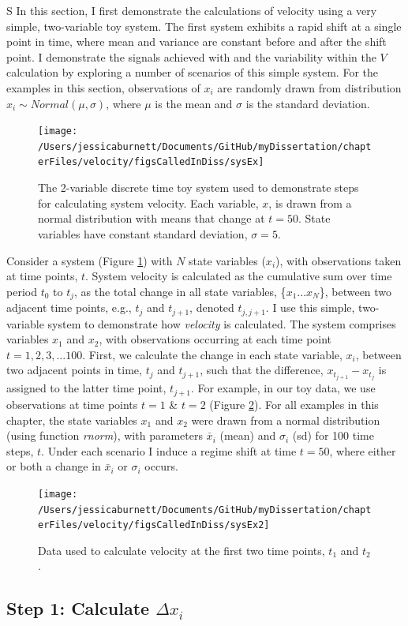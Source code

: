 \documentclass[12pt,twoside,openany]{reedthesis}
\begin{document}
S
In this section, I first demonstrate the calculations of velocity using a very simple, two-variable toy system. The first system exhibits a rapid shift at a single point in time, where mean and variance are constant before and after the shift point. I demonstrate the signals achieved with and the variability within the \(V\) calculation by exploring a number of scenarios of this simple system. For the examples in this section, observations of \(x_i\) are randomly drawn from distribution \(x_i\sim Normal(\mu, \sigma)\), where \(\mu\) is the mean and \(\sigma\) is the standard deviation.
\begin{figure}
\texttt{[image: /Users/jessicaburnett/Documents/GitHub/myDissertation/chapterFiles/velocity/figsCalledInDiss/sysEx]} \caption{The 2-variable discrete time toy system used to demonstrate steps for calculating system velocity. Each variable, $x$, is drawn from a normal distribution with means that change at $t = 50$. State variables have constant standard deviation, $\sigma = 5$.}\label{fig:sysEx}
\end{figure}
Consider a system (Figure \ref{fig:sysEx}) with \(N\) state variables (\(x_i\)), with observations taken at time points, \(t\). System velocity is calculated as the cumulative sum over time period \(t_0\) to \(t_j\), as the total change in all state variables, \{\(x_1 ...x_N\)\}, between two adjacent time points, e.g., \(t_j\) and \(t_{j+1}\), denoted \(t_{j,j+1}\). I use this simple, two-variable system to demonstrate how \emph{velocity} is calculated. The system comprises variables \(x_1\) and \(x_2\), with observations occurring at each time point \(t = {1,2,3,...100}\). First, we calculate the change in each state variable, \(x_i\), between two adjacent points in time, \(t_j\) and \(t_{j+1}\), such that the difference, \(x_{t_{j+1}} - x_{t_j}\) is assigned to the latter time point, \(t_{j+1}\). For example, in our toy data, we use observations at time points \(t = 1\) \& \(t=2\) (Figure \ref{fig:sysEx2}). For all examples in this chapter, the state variables \(x_1\) and \(x_2\) were drawn from a normal distribution (using function \emph{rnorm}), with parameters \(\bar{x}_i\) (mean) and \(\sigma_i\) (sd) for 100 time steps, \(t\). Under each scenario I induce a regime shift at time \(t=50\), where either or both a change in \(\bar{x}_i\) or \(\sigma_i\) occurs.
\begin{figure}
\texttt{[image: /Users/jessicaburnett/Documents/GitHub/myDissertation/chapterFiles/velocity/figsCalledInDiss/sysEx2]} \caption{Data used to calculate velocity at the first two time points, $t_1$ and $t_2$.}\label{fig:sysEx2}
\end{figure}
\hypertarget{step-1-calculate-delta-x_i}{%
\subsection{\texorpdfstring{Step 1: Calculate \(\Delta x_i\)}{Step 1: Calculate \textbackslash Delta x\_i}}\label{step-1-calculate-delta-x_i}}
\end{document}
